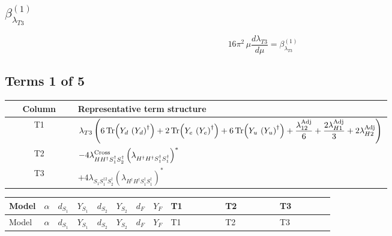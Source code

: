 \documentclass[8pt]{article}
\begin{document}
\begin{landscape}
\section*{$\beta_{\lambda_{T3}}^{(1)}$}
\[16\pi^2\,\mu\frac{d \lambda_{T3}}{d\mu}=\beta_{\lambda_{T3}}^{(1)}\]
\subsection*{Terms 1 of 5}
\begin{center}
\begin{tabular}{@{}c >{\raggedright\arraybackslash}p{0.82\linewidth}@{}}
\toprule
Column & Representative term structure \\
\midrule
T1 & \(\displaystyle {\lambda_{T3}} \left(6 \operatorname{Tr}\!\left({Y_d}\,\left({Y_d}\right)^{\dagger}\right)+2 \operatorname{Tr}\!\left({Y_e}\,\left({Y_e}\right)^{\dagger}\right)+6 \operatorname{Tr}\!\left({Y_u}\,\left({Y_u}\right)^{\dagger}\right)+\frac{{\lambda_{12}^{\rm Adj}}}{6}+\frac{2 {\lambda_{H1}^{\rm Adj}}}{3}+2 {\lambda_{H2}^{\rm Adj}}\right)\) \\
\midrule
T2 & \(\displaystyle -4 {\lambda_{H H^\dagger S_1^\dagger S_2^\dagger}^{\rm Cross}} \left({\lambda_{H^\dagger H^\dagger S_1^\dagger S_1^\dagger}}\right)^{*}\) \\
\midrule
T3 & \(\displaystyle +4 {\lambda_{S_1 S_1^{\dagger 2}S_2^\dagger}} \left({\lambda_{H^\dagger H^\dagger S_1^\dagger S_1^\dagger}}\right)^{*}\) \\
\midrule
\bottomrule
\end{tabular}
\end{center}
\smallskip
\tiny
\begin{longtable}{@{}llcccccc >{\raggedright\arraybackslash}p{0.21\linewidth} >{\raggedright\arraybackslash}p{0.21\linewidth} >{\raggedright\arraybackslash}p{0.21\linewidth}@{}}
\toprule
Model & $\alpha$ & $d_{S_1}$ & $Y_{S_1}$ & $d_{S_2}$ & $Y_{S_2}$ & $d_F$ & $Y_F$ & T1 & T2 & T3 \\
\midrule
\endfirsthead
\toprule
Model & $\alpha$ & $d_{S_1}$ & $Y_{S_1}$ & $d_{S_2}$ & $Y_{S_2}$ & $d_F$ & $Y_F$ & T1 & T2 & T3 \\
\midrule
\endhead

\end{longtable}
\end{landscape}
\end{document}
